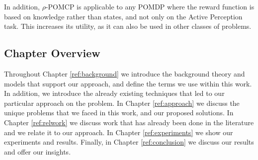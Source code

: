 In addition, $\rho$-POMCP is applicable to any POMDP where the reward function is based on knowledge
rather than states, and not only on the Active Perception task. This increases its utility, as it
can also be used in other classes of problems.

%
%
%

\subsection{Chapter Overview}
Throughout Chapter \ref{ref:background} we introduce the background theory and models that support
our approach, and define the terms we use within this work. In addition, we introduce the already
existing techniques that led to our particular approach on the problem. In Chapter
\ref{ref:approach} we discuss the unique problems that we faced in this work, and our proposed
solutions. In Chapter \ref{ref:relwork} we discuss work that has already been done in the literature
and we relate it to our approach. In Chapter \ref{ref:experiments} we show our experiments and
results. Finally, in Chapter \ref{ref:conclusion} we discuss our results and offer our insights.

